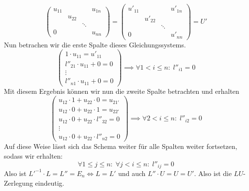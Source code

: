 \documentclass{article}
\theoremstyle{definition}
\begin{document}
\begin{enumerate}[(a)]
\[\begin{pmatrix}
                  u_{11} &        &        & u_{1n} \\
                         & u_{22} &        &        \\
                         &        & \ddots &        \\
                  0      &        &        & u_{nn}
              \end{pmatrix} = \begin{pmatrix}
                  u'_{11} &         &        & u'_{1n} \\
                          & u'_{22} &        &         \\
                          &         & \ddots &         \\
                  0       &         &        & u'_{nn}
              \end{pmatrix} = U'
          \]
          Nun betrachen wir die erste Spalte dieses Gleichungssystems.
          \[
              \begin{pmatrix}
                  1 \cdot u_{11} = u'_{11}      \\
                  l''_{21} \cdot u_{11} + 0 = 0 \\
                  \vdots                        \\
                  l''_{n1} \cdot u_{11} + 0 = 0
              \end{pmatrix} \implies \forall 1 < i \leq n\colon\; l''_{i1} = 0
          \]
          Mit diesem Ergebnis können wir nun die zweite Spalte betrachten und erhalten
          \[
              \begin{pmatrix}
                  u_{12}\cdot 1 + u_{22}\cdot 0 = u_{21'}  \\
                  u_{12}\cdot 0 + u_{22}\cdot 1 = u_{22'}  \\
                  u_{12}\cdot 0 + u_{22}\cdot l''_{32} = 0 \\
                  \vdots                                   \\
                  u_{12}\cdot 0 + u_{22}\cdot l''_{n2} = 0
              \end{pmatrix}  \implies \forall 2 < i \leq n\colon\; l''_{i2} = 0
          \]
          Auf diese Weise lässt sich das Schema weiter für alle Spalten weiter fortsetzen, sodass wir erhalten:
          \[
              \forall 1 \leq j \leq n\colon\; \forall j < i \leq n\colon\; l''_{ij} = 0
          \]
          Also ist $L'^{-1} \cdot L = L'' = E_n \Leftrightarrow L = L'$ und auch $L''\cdot U = U = U'$. Also ist die $LU$-Zerlegung eindeutig.
\end{enumerate}
\end{document}
